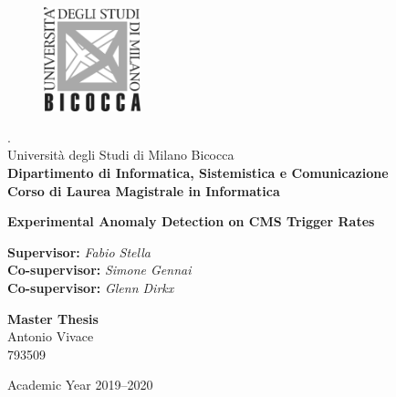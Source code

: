 
\begin{onehalfspace}
	\begin{figure}
		\vspace*{-7mm}
		\centering
		\includegraphics[width=0.25\textwidth]{logo-milano-bicocca.jpg}
	\end{figure}
	. \\ Università degli Studi di Milano Bicocca \\
	\textbf{Dipartimento di Informatica, Sistemistica e Comunicazione \\
			Corso di Laurea Magistrale in Informatica}
\end{onehalfspace}

\vfill
\par

\begin{doublespace}
\begin{center}
	{\Huge \textbf{Experimental Anomaly Detection on CMS Trigger Rates}}
\end{center}
\end{doublespace}

\vfill
\par

\begin{onehalfspace}
\begin{flushleft}
	{\textbf{Supervisor:} \textit{Fabio Stella} \\
	 \textbf{Co-supervisor:} \textit{Simone Gennai} \\
	 \textbf{Co-supervisor:} \textit{Glenn Dirkx}}
\end{flushleft}

\vspace{8mm}
\par

\begin{flushright}
	{\large \textbf{Master Thesis} \\
			Antonio Vivace \\ 793509}
\end{flushright}
\end{onehalfspace}

\vfill
\par

\begin{center}
	{\large Academic Year 2019--2020}
\end{center}